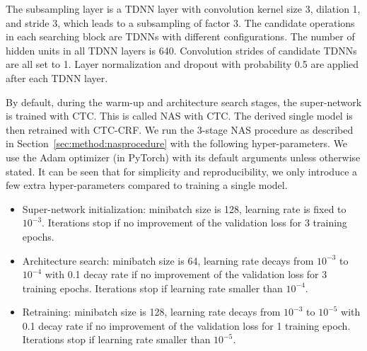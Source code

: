 \documentclass{article}
\newcommand{\secref}{Section~\ref}
\begin{document}
The subsampling layer is a TDNN layer with convolution kernel size 3, dilation 1, and stride 3, which leads to a subsampling of factor 3.
The candidate operations in each searching block are TDNNs with different configurations.
The number of hidden units in all TDNN layers is 640.
Convolution strides of candidate TDNNs are all set to 1.
Layer normalization and dropout with probability 0.5 are applied after each TDNN layer.

By default, during the warm-up and architecture search stages, the super-network is trained with CTC. This is called NAS with CTC.
The derived single model is then retrained with CTC-CRF.
We run the 3-stage NAS procedure as described in \secref{sec:method:nasprocedure} with the following hyper-parameters. We use the Adam optimizer (in PyTorch) with its default arguments unless otherwise stated. It can be seen that for simplicity and reproducibility, we only introduce a few extra hyper-parameters compared to training a single model.
\begin{itemize}
    \item Super-network initialization: minibatch size is 128, learning rate is fixed to $10^{-3}$. Iterations stop if no improvement of the validation loss for 3 training epochs.
    \item Architecture search: minibatch size is 64, learning rate decays from $10^{-3}$ to $10^{-4}$ with 0.1 decay rate if no improvement of the validation loss for 3 training epochs. Iterations stop if learning rate smaller than $10^{-4}$.
    \item Retraining: minibatch size is 128, learning rate decays from $10^{-3}$ to $10^{-5}$ with 0.1 decay rate if no improvement of the validation loss for 1 training epoch. Iterations stop if learning rate smaller than $10^{-5}$.
\end{itemize}


\vspace{-2mm}
\end{document}
